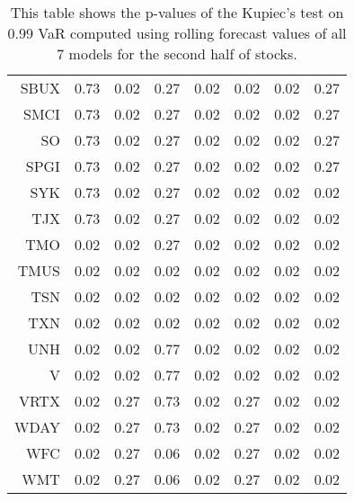 \begin{table}[ht]
\begin{tabular}{rrrrrrrr}
  SBUX & 0.73 & 0.02 & 0.27 & 0.02 & 0.02 & 0.02 & 0.27 \\ 
  SMCI & 0.73 & 0.02 & 0.27 & 0.02 & 0.02 & 0.02 & 0.27 \\ 
  SO & 0.73 & 0.02 & 0.27 & 0.02 & 0.02 & 0.02 & 0.27 \\ 
  SPGI & 0.73 & 0.02 & 0.27 & 0.02 & 0.02 & 0.02 & 0.27 \\ 
  SYK & 0.73 & 0.02 & 0.27 & 0.02 & 0.02 & 0.02 & 0.02 \\ 
  TJX & 0.73 & 0.02 & 0.27 & 0.02 & 0.02 & 0.02 & 0.02 \\ 
  TMO & 0.02 & 0.02 & 0.27 & 0.02 & 0.02 & 0.02 & 0.02 \\ 
  TMUS & 0.02 & 0.02 & 0.02 & 0.02 & 0.02 & 0.02 & 0.02 \\ 
  TSN & 0.02 & 0.02 & 0.02 & 0.02 & 0.02 & 0.02 & 0.02 \\ 
  TXN & 0.02 & 0.02 & 0.02 & 0.02 & 0.02 & 0.02 & 0.02 \\ 
  UNH & 0.02 & 0.02 & 0.77 & 0.02 & 0.02 & 0.02 & 0.02 \\ 
  V & 0.02 & 0.02 & 0.77 & 0.02 & 0.02 & 0.02 & 0.02 \\ 
  VRTX & 0.02 & 0.27 & 0.73 & 0.02 & 0.27 & 0.02 & 0.02 \\ 
  WDAY & 0.02 & 0.27 & 0.73 & 0.02 & 0.27 & 0.02 & 0.02 \\ 
  WFC & 0.02 & 0.27 & 0.06 & 0.02 & 0.27 & 0.02 & 0.02 \\ 
  WMT & 0.02 & 0.27 & 0.06 & 0.02 & 0.27 & 0.02 & 0.02 \\ 
   \hline
\end{tabular}
\caption[Kupiec's test p-values, alpha =0.99 (2)]{This table shows the p-values of the Kupiec's test on 0.99 VaR computed using rolling forecast values of all 7 models for the second half of stocks.} 
\label{Table:Kupiec_test_rolling_0.99_2}
\end{table}
